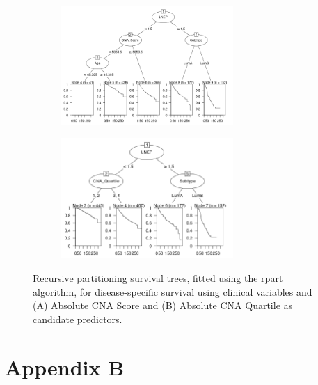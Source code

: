\begin{figure}[!htb]
\centering

\begin{subfigure}{\textwidth}
\subcaption{}
\centering
\includegraphics[width=0.72\textwidth]{../figures/Appendices/Appendix_A/LuminalAB_Rpart_DSS_Score.png}
\end{subfigure}

\begin{subfigure}{\textwidth}
\subcaption{}
\centering
\includegraphics[width=0.72\textwidth]{../figures/Appendices/Appendix_A/LuminalAB_Rpart_DSS_Quart.png}
\end{subfigure}
\caption[Recursive partitioning survival trees, fitted using the rpart algorithm, for disease-specific survival using clinical variables and Absolute CNA Score/Quartile as candidate predictors.]{Recursive partitioning survival trees, fitted using the rpart algorithm, for disease-specific survival using clinical variables and (A) Absolute CNA Score and (B) Absolute CNA Quartile as candidate predictors.}
\label{fig:LumAB_Trees_Quart_Rpart}
\end{figure}


\section*{Appendix B}
\renewcommand{\thefigure}{B\arabic{figure}}
\renewcommand{\thetable}{B\arabic{table}}
\setcounter{figure}{0}
\setcounter{table}{0}

